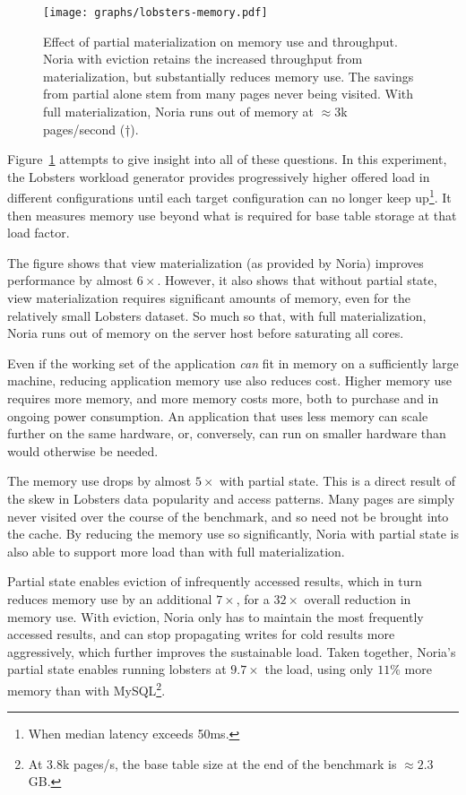 \begin{figure}[h]
  \centering
  \texttt{[image: graphs/lobsters-memory.pdf]}
  \caption{Effect of partial materialization on memory use and throughput. Noria
  with eviction retains the increased throughput from materialization, but
  substantially reduces memory use. The savings from partial alone stem from
  many pages never being visited. With full materialization, Noria runs out of
  memory at $\approx$3k pages/second (†).}
  \label{f:lobsters-memory}
\end{figure}

Figure~\ref{f:lobsters-memory} attempts to give insight into all of these
questions. In this experiment, the Lobsters workload generator provides
progressively higher offered load in different configurations until each target
configuration can no longer keep up\footnote{When median latency exceeds 50ms.}.
It then measures memory use beyond what is required for base table storage at
that load factor.

The figure shows that view materialization (as provided by Noria) improves
performance by almost $6\times$. However, it also shows that without
partial state, view materialization requires significant amounts of memory, even
for the relatively small Lobsters dataset. So much so that, with full
materialization, Noria runs out of memory on the server host before saturating
all cores.

Even if the working set of the application \emph{can} fit in memory on a
sufficiently large machine, reducing application memory use also reduces cost.
Higher memory use requires more memory, and more memory costs more, both to
purchase and in ongoing power consumption. An application that uses less memory
can scale further on the same hardware, or, conversely, can run on smaller
hardware than would otherwise be needed.

The memory use drops by almost $5\times$ with partial state. This is a direct
result of the skew in Lobsters data popularity and access patterns. Many pages
are simply never visited over the course of the benchmark, and so need not be
brought into the cache. By reducing the memory use so significantly, Noria with
partial state is also able to support more load than with full materialization.

Partial state enables eviction of infrequently accessed results, which in turn
reduces memory use by an additional $7\times$, for a $32\times$ overall
reduction in memory use. With eviction, Noria only has to maintain the most
frequently accessed results, and can stop propagating writes for cold results
more aggressively, which further improves the sustainable load. Taken together,
Noria's partial state enables running lobsters at $9.7\times$ the load, using
only $11\%$ more memory than with MySQL\footnote{At 3.8k pages/s, the base table
size at the end of the benchmark is $\approx2.3$GB.}.

